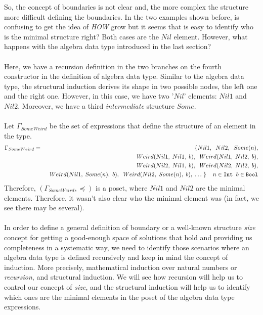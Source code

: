 So, the concept of boundaries is not clear and, the more complex the structure more difficult defining the boundaries. In the two examples shown before, is confusing to get the idea of \textit{HOW} grow but it seems that is easy to identify who is the minimal structure right? Both cases are the $Nil$ element. However, what happens with the  algebra data type introduced in the last section?\\\\
Here, we have a recursion definition in the two branches on the fourth constructor in the definition of  algebra data type. Similar to the  algebra data type, the structural induction derives its shape in two possible nodes, the left one and the right one. However, in this case, we have two '$Nil$' elements: $Nil1$ and $Nil2$. Moreover, we have a third \textit{intermediate} structure $Some$.\\\\
Let $\Gamma_{SomeWeird}$ be the set of expressions that define the structure of an element in the  type.
\begin{eqnarray*}
	\Gamma_{SomeWeird} & = & \{ Nil1, \;\; Nil2, \;\; Some(n), \\
	&& \;\; Weird(Nil1, \; Nil1, \; b), \;\; Weird(Nil1, \; Nil2, \; b), \\
	&& \;\; Weird(Nil2, \; Nil1, \; b), \;\; Weird(Nil2, \; Nil2, \; b),  \\
	&& \;\; Weird(Nil1, \; Some(n), \; b), \;\; Weird(Nil2, \; Some(n), \; b), \; \ldots \; \} \;\; \;\; n \in \texttt{Int} \;\; b \in \texttt{Bool}
\end{eqnarray*}
Therefore, $(\Gamma_{SomeWeird}, \preceq)$ is a poset, where $Nil1$ and $Nil2$ are the minimal elements. Therefore, it wasn't also clear who the minimal element was (in fact, we see there may be several).\\\\
In order to define a general definition of boundary or a well-known structure \textit{size} concept for getting a good-enough space of solutions that hold and providing us completeness in a systematic way, we need to identify those scenarios where an algebra data type is defined recursively and keep in mind the concept of induction. More precisely, mathematical induction over natural numbers or \textit{recursion}, and structural induction. We will see how recursion will help us to control our concept of \textit{size}, and the structural induction will help us to identify which ones are the minimal elements in the poset of the algebra data type expressions.\\\\
